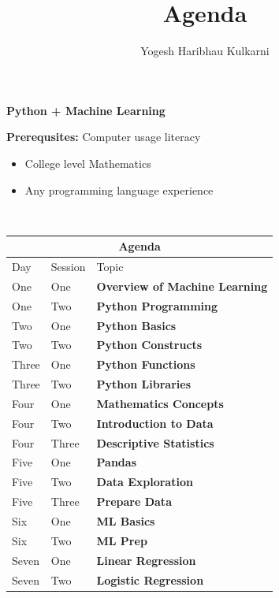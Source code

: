 \documentclass[a4paper, 11pt]{article}
\title{Agenda}
\author{Yogesh Haribhau Kulkarni}
\begin{document}
\pagestyle{mystyle}

\makebox[\linewidth]{\rule{\linewidth}{1pt}}
\begin{center} 
\textbf{\Large Python + Machine Learning}
\end{center}
\makebox[\linewidth]{\rule{\linewidth}{1pt}}

\textbf{Prerequsites:} Computer usage literacy
\begin{itemize}[itemsep=0pt]
\item College level Mathematics
\item Any programming language experience
\end{itemize}

\makebox[\linewidth]{\rule{\linewidth}{0.4pt}}\\

\begin{center} 
\begin{tabular}{ |p{1cm}|p{1cm}||p{10cm}|}
\hline
\multicolumn{3}{|c|}{\textbf{\large Agenda}} \\
\hline
Day & Session & Topic\\
 \hline
One   	&  	One    	&  	\textbf{Overview of Machine Learning}\\
One 	&   Two  	&   \textbf{Python Programming} \\
\hline
Two   	&  	One    	& 	\textbf{Python Basics} \\
Two   	&  	Two    	& 	\textbf{Python Constructs} \\
\hline
Three   &  	One    	& 	\textbf{Python Functions} \\
Three   &  	Two    	& 	\textbf{Python Libraries} \\
\hline
Four   	&  	One    	& 	\textbf{Mathematics Concepts} \\
Four   	&  	Two    	& 	\textbf{Introduction to Data} \\
Four   	&  	Three   & 	\textbf{Descriptive Statistics} \\
\hline
Five   	&  	One    	& 	\textbf{Pandas} \\
Five   	&  	Two    	& 	\textbf{Data Exploration} \\
Five   	&  	Three   & 	\textbf{Prepare Data} \\
\hline
Six   	&  	One    	& 	\textbf{ML Basics} \\
Six   	&  	Two    	& 	\textbf{ML Prep} \\
\hline
Seven   &  	One    	& 	\textbf{Linear Regression} \\
Seven  	&  	Two    	& 	\textbf{Logistic Regression} \\

\end{tabular}
\end{center}
\end{document}

